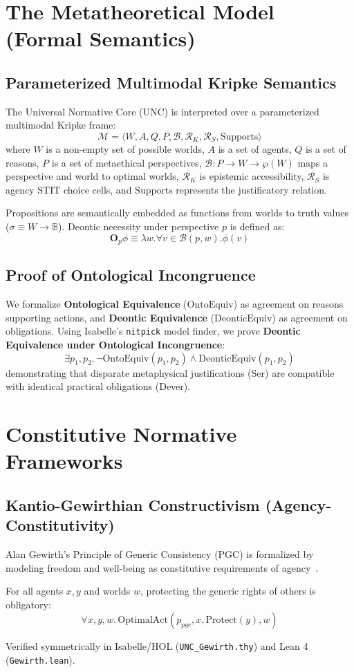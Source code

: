 \documentclass[runningheads]{llncs}
\begin{document}
\section{The Metatheoretical Model (Formal Semantics)}

\subsection{Parameterized Multimodal Kripke Semantics}
The Universal Normative Core (UNC) is interpreted over a parameterized multimodal Kripke frame:
\[
\mathcal{M} = \langle W, A, Q, P, \mathcal{B}, \mathcal{R}_K, \mathcal{R}_S, \text{Supports} \rangle
\]
where $W$ is a non-empty set of possible worlds, $A$ is a set of agents, $Q$ is a set of reasons, $P$ is a set of metaethical perspectives, $\mathcal{B} : P \to W \to \wp(W)$ maps a perspective and world to optimal worlds, $\mathcal{R}_K$ is epistemic accessibility, $\mathcal{R}_S$ is agency STIT choice cells, and $\text{Supports}$ represents the justificatory relation.

Propositions are semantically embedded as functions from worlds to truth values ($\sigma \equiv W \to \mathbb{B}$). Deontic necessity under perspective $p$ is defined as:
\[
\mathbf{O}_p \phi \equiv \lambda w. \forall v \in \mathcal{B}(p, w). \phi(v)
\]

\subsection{Proof of Ontological Incongruence}
We formalize \textbf{Ontological Equivalence} ($\text{OntoEquiv}$) as agreement on reasons supporting actions, and \textbf{Deontic Equivalence} ($\text{DeonticEquiv}$) as agreement on obligations. Using Isabelle's \texttt{nitpick} model finder, we prove \textbf{Deontic Equivalence under Ontological Incongruence}:
\[
\exists p_1, p_2.\, \neg \text{OntoEquiv}(p_1, p_2) \wedge \text{DeonticEquiv}(p_1, p_2)
\]
demonstrating that disparate metaphysical justifications (Ser) are compatible with identical practical obligations (Dever).

\section{Constitutive Normative Frameworks}

\subsection{Kantio-Gewirthian Constructivism (Agency-Constitutivity)}
Alan Gewirth's Principle of Generic Consistency (PGC) is formalized by modeling freedom and well-being as constitutive requirements of agency~\cite{gewirth1978reason}.
\begin{theorem}
For all agents $x, y$ and worlds $w$, protecting the generic rights of others is obligatory:
\[
\forall x, y, w.\, \text{OptimalAct}(p_{pgc}, x, \text{Protect}(y), w)
\]
\end{theorem}
Verified symmetrically in Isabelle/HOL (\texttt{UNC\_Gewirth.thy}) and Lean 4 (\texttt{Gewirth.lean}).
\end{document}
